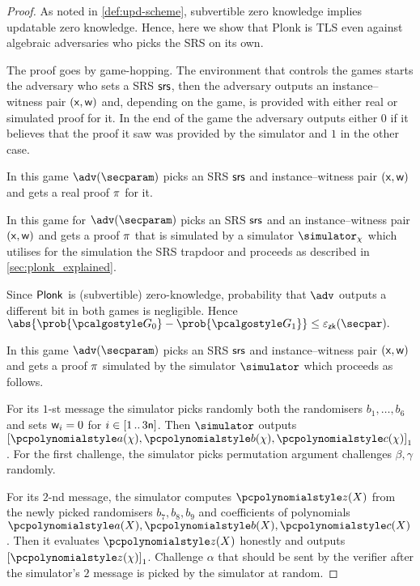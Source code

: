 \begin{proof}
  As noted in \cref{def:upd-scheme}, subvertible zero knowledge implies updatable zero
  knowledge. Hence, here we show that Plonk is TLS even against algebraic adversaries who picks
  the SRS on its own.
  
  The proof goes by game-hopping. The environment that controls the games
  starts the adversary who sets a SRS $\mathsf{srs}$, then the adversary outputs an
  instance--witness pair $(\mathsf{x}, \mathsf{w})$ and, depending on the game, is provided
  with either real or simulated proof for it. In the end of the game the
  adversary outputs either $0$ if it believes that the proof it saw was provided
  by the simulator and $1$ in the other case.

   In this game $\adv(\secparam)$ picks an SRS $\mathsf{srs}$ and instance--witness pair
  $(\mathsf{x}, \mathsf{w})$ and gets a real proof $\pi$ for it.

   In this game for $\adv(\secparam)$ picks an SRS $\mathsf{srs}$ and an instance--witness pair
  $(\mathsf{x}, \mathsf{w})$ and gets a proof $\pi$ that is simulated by a simulator
  $\simulator_\chi$ which utilises for the simulation the SRS trapdoor and
  proceeds as described in \cref{sec:plonk_explained}.

   Since $\textnormal{\textsf{Plonk}}$ is (subvertible) zero-knowledge,
  probability that $\adv$ outputs a different bit in both games is negligible.
  Hence
  \(
	\abs{\prob{\game{0}} - \prob{\game{1}}} \leq \epszk(\secpar).
\)

 In this game $\adv(\secparam)$ picks an SRS $\mathsf{srs}$ and instance--witness pair
$(\mathsf{x}, \mathsf{w})$ and gets a proof $\pi$ simulated by the simulator
$\simulator$ which proceeds as follows.

For its $1$-st message the simulator  picks randomly both the randomisers $b_1, \ldots, b_6$ and
sets $\mathsf{w}_i = 0$ for $i \in [1 \, .. \, 3\mathsf{n}]$. Then $\simulator$
outputs $\gone{\p{a}(\chi), \p{b}(\chi), \p{c}(\chi)}$. For the first
challenge, the simulator picks permutation argument challenges $\beta, \gamma$
randomly.

For its $2$-nd message, the simulator computes $\p{z}(X)$ from
the newly picked randomisers $b_7, b_8, b_9$ and coefficients of polynomials
$\p{a}(X), \p{b}(X), \p{c}(X)$. Then it evaluates $\p{z}(X)$ honestly and outputs
$\gone{\p{z}(\chi)}$. Challenge $\alpha$ that should be sent by the verifier
after the simulator's $2$ message is picked by the simulator at random.


\end{proof}
